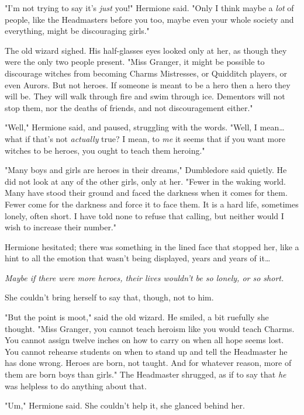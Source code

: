 "I'm not trying to say it's \emph{just} you!" Hermione said. "Only I think 
maybe a \emph{lot} of people, like the Headmasters before you too, maybe even 
your whole society and everything, might be discouraging girls."

The old wizard sighed. His half-glasses eyes looked only at her, as though they 
were the only two people present. "Miss Granger, it might be possible to 
discourage witches from becoming Charms Mistresses, or Quidditch players, or 
even Aurors. But not heroes. If someone is meant to be a hero then a hero they 
will be. They will walk through fire and swim through ice. Dementors will not 
stop them, nor the deaths of friends, and not discouragement either."

"Well," Hermione said, and paused, struggling with the words. "Well, I 
mean{\ldots} what if that's not \emph{actually} true? I mean, to \emph{me} it 
seems that if you want more witches to be heroes, you ought to teach them 
heroing."

"Many boys and girls are heroes in their dreams," Dumbledore said quietly. He 
did not look at any of the other girls, only at her. "Fewer in the waking 
world. Many have stood their ground and faced the darkness when it comes for 
them. Fewer come for the darkness and force it to face them. It is a hard life, 
sometimes lonely, often short. I have told none to refuse that calling, but 
neither would I wish to increase their number."

Hermione hesitated; there was something in the lined face that stopped her, 
like a hint to all the emotion that wasn't being displayed, years and years of 
it{\ldots}

\emph{Maybe if there were more heroes, their lives wouldn't be so lonely, or so 
short.}

She couldn't bring herself to say that, though, not to him.

"But the point is moot," said the old wizard. He smiled, a bit ruefully she 
thought. "Miss Granger, you cannot teach heroism like you would teach Charms. 
You cannot assign twelve inches on how to carry on when all hope seems lost. 
You cannot rehearse students on when to stand up and tell the Headmaster he has 
done wrong. Heroes are born, not taught. And for whatever reason, more of them 
are born boys than girls." The Headmaster shrugged, as if to say that \emph{he} 
was helpless to do anything about that.

"Um," Hermione said. She couldn't help it, she glanced behind her.

